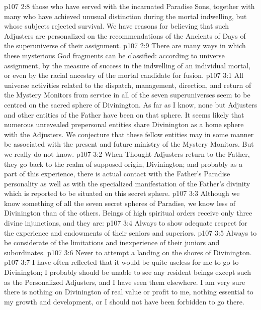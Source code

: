 \vs p107 2:8 \bibnobreakspace {} those who have served with the incarnated Paradise Sons, together with many who have achieved unusual distinction during the mortal indwelling, but whose subjects rejected survival. We have reasons for believing that such Adjusters are personalized on the recommendations of the Ancients of Days of the superuniverse of their assignment.
\vs p107 2:9 \pc There are many ways in which these mysterious God fragments can be classified: according to universe assignment, by the measure of success in the indwelling of an individual mortal, or even by the racial ancestry of the mortal candidate for fusion.
\vs p107 3:1 All universe activities related to the dispatch, management, direction, and return of the Mystery Monitors from service in all of the seven superuniverses seem to be centred on the sacred sphere of Divinington. As far as I know, none but Adjusters and other entities of the Father have been on that sphere. It seems likely that numerous unrevealed prepersonal entities share Divinington as a home sphere with the Adjusters. We conjecture that these fellow entities may in some manner be associated with the present and future ministry of the Mystery Monitors. But we really do not know.
\vs p107 3:2 When Thought Adjusters return to the Father, they go back to the realm of supposed origin, Divinington; and probably as a part of this experience, there is actual contact with the Father’s Paradise personality as well as with the specialized manifestation of the Father’s divinity which is reported to be situated on this secret sphere.
\vs p107 3:3 Although we know something of all the seven secret spheres of Paradise, we know less of Divinington than of the others. Beings of high spiritual orders receive only three divine injunctions, and they are:
\vs p107 3:4 \bibnobreakspace Always to show adequate respect for the experience and endowments of their seniors and superiors.
\vs p107 3:5 \bibnobreakspace Always to be considerate of the limitations and inexperience of their juniors and subordinates.
\vs p107 3:6 \bibnobreakspace Never to attempt a landing on the shores of Divinington.
\vs p107 3:7 I have often reflected that it would be quite useless for me to go to Divinington; I probably should be unable to see any resident beings except such as the Personalized Adjusters, and I have seen them elsewhere. I am very sure there is nothing on Divinington of real value or profit to me, nothing essential to my growth and development, or I should not have been forbidden to go there.
